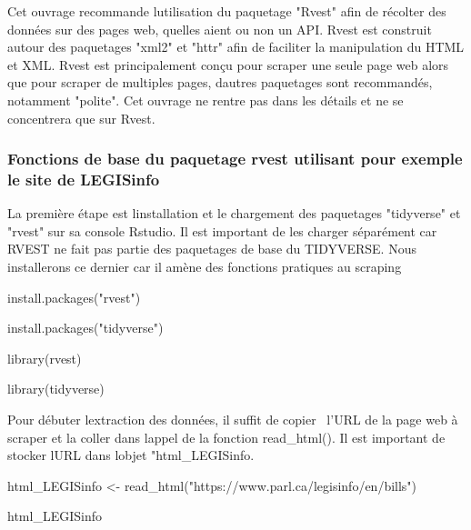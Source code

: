 \documentclass[
  letterpaper,
  DIV=11,
  numbers=noendperiod]{scrreprt}
\newenvironment{Shaded}{\begin{snugshade}}{\end{snugshade}}
\newcommand{\ErrorTok}[1]{\textcolor[rgb]{0.68,0.00,0.00}{#1}}
\newcommand{\ExtensionTok}[1]{\textcolor[rgb]{0.00,0.23,0.31}{#1}}
\newcommand{\KeywordTok}[1]{\textcolor[rgb]{0.00,0.23,0.31}{#1}}
\newcommand{\NormalTok}[1]{\textcolor[rgb]{0.00,0.23,0.31}{#1}}
\newcommand{\OperatorTok}[1]{\textcolor[rgb]{0.37,0.37,0.37}{#1}}
\newcommand{\StringTok}[1]{\textcolor[rgb]{0.13,0.47,0.30}{#1}}
\begin{document}
Cet ouvrage recommande l\textquotesingle utilisation du paquetage
"Rvest" afin de récolter des données sur des pages web,
qu\textquotesingle elles aient ou non un API. Rvest est construit autour
des paquetages "xml2" et "httr" afin de faciliter la manipulation du
HTML et XML. Rvest est principalement conçu pour scraper une seule page
web alors que pour scraper de multiples pages, d\textquotesingle autres
paquetages sont recommandés, notamment "polite". Cet ouvrage ne rentre
pas dans les détails et ne se concentrera que sur Rvest.

\subsubsection{\texorpdfstring{\textbf{Fonctions de base du paquetage
rvest utilisant pour exemple le site de
LEGISinfo}}{Fonctions de base du paquetage rvest utilisant pour exemple le site de LEGISinfo}}\label{fonctions-de-base-du-paquetage-rvest-utilisant-pour-exemple-le-site-de-legisinfo}

La première étape est l\textquotesingle installation et le chargement
des paquetages "tidyverse" et "rvest" sur sa console Rstudio. Il est
important de les charger séparément car RVEST ne fait pas partie des
paquetages de base du TIDYVERSE. Nous installerons ce dernier car il
amène des fonctions pratiques au scraping

\begin{Shaded}
\begin{Highlighting}[]
\ExtensionTok{install.packages}\ErrorTok{(}\StringTok{"rvest"}\KeywordTok{)}

\ExtensionTok{install.packages}\ErrorTok{(}\StringTok{"tidyverse"}\KeywordTok{)}

\ExtensionTok{library}\ErrorTok{(}\ExtensionTok{rvest}\KeywordTok{)}

\ExtensionTok{library}\ErrorTok{(}\ExtensionTok{tidyverse}\KeywordTok{)}
\end{Highlighting}
\end{Shaded}

Pour débuter l\textquotesingle extraction des données, il suffit de
copier~ l'URL de la page web à scraper et la coller dans
l\textquotesingle appel de la fonction read\_html(). Il est important de
stocker l\textquotesingle URL dans l\textquotesingle objet
"html\_LEGISinfo.

\begin{Shaded}
\begin{Highlighting}[]
\ExtensionTok{html\_LEGISinfo} \OperatorTok{\textless{}}\NormalTok{{-} read\_html}\ErrorTok{(}\StringTok{"https://www.parl.ca/legisinfo/en/bills"}\KeywordTok{)}

\ExtensionTok{html\_LEGISinfo}
\end{Highlighting}
\end{Shaded}
\end{document}
